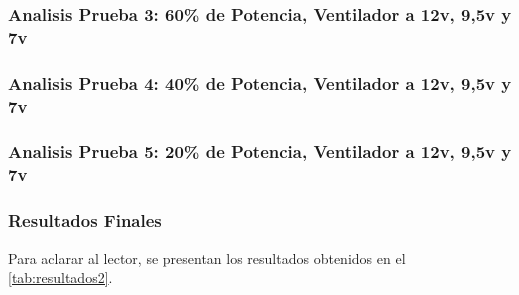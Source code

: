 \documentclass[spanish, a4paper, 11pt]{article}
\begin{document}
\subsubsection{Analisis Prueba 3: 60\% de Potencia, Ventilador a 12v, 9,5v y 7v}

\subsubsection{Analisis Prueba 4: 40\% de Potencia, Ventilador a 12v, 9,5v y 7v}

\subsubsection{Analisis Prueba 5: 20\% de Potencia, Ventilador a 12v, 9,5v y 7v}

\subsubsection{Resultados Finales}

Para aclarar al lector, se presentan los resultados obtenidos en el \ref{tab:resultados2}.
\end{document}
